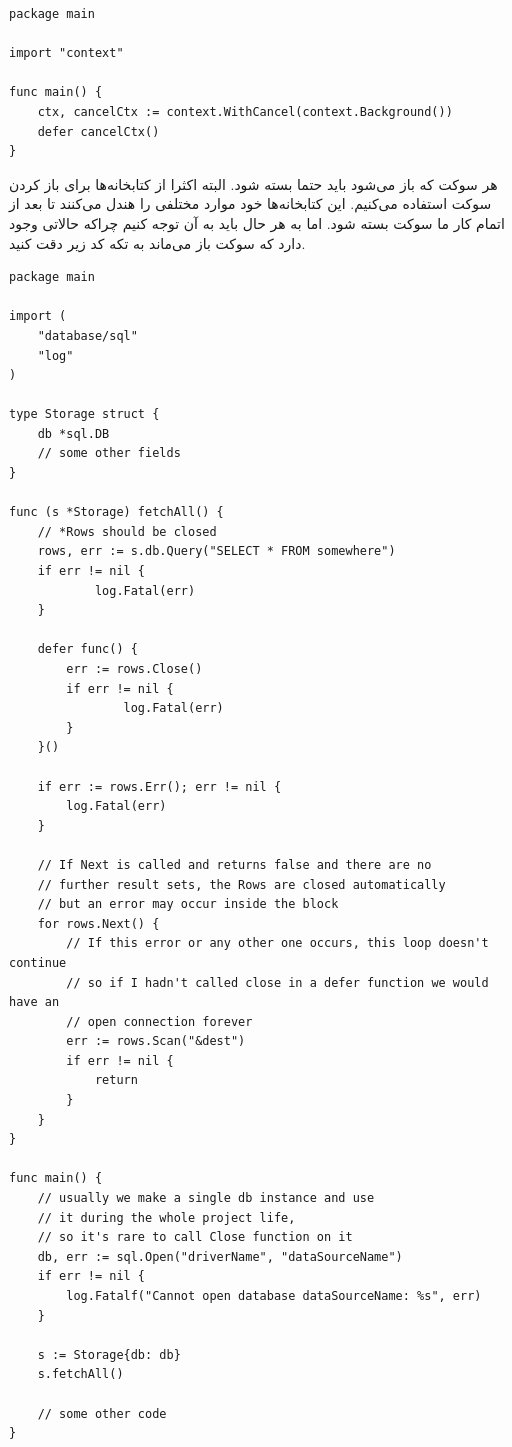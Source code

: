\documentclass[a4]{report}
\begin{document}
\begin{latin}
\begin{verbatim}
package main

import "context"

func main() {
    ctx, cancelCtx := context.WithCancel(context.Background())
    defer cancelCtx()
}
\end{verbatim}
\end{latin}

هر سوکت که باز می‌شود باید حتما بسته شود. البته اکثرا از کتابخانه‌ها برای باز کردن سوکت استفاده می‌کنیم. این کتابخانه‌ها خود موارد مختلفی را هندل می‌کنند تا بعد از اتمام کار ما سوکت بسته شود.
اما به هر حال باید به آن توجه کنیم چراکه حالاتی وجود دارد که سوکت باز می‌ماند به تکه کد زیر دقت کنید.

\begin{latin}
\begin{verbatim}
package main

import (
    "database/sql"
    "log"
)

type Storage struct {
    db *sql.DB
    // some other fields
}

func (s *Storage) fetchAll() {
    // *Rows should be closed
    rows, err := s.db.Query("SELECT * FROM somewhere")
    if err != nil {
            log.Fatal(err)
    }

    defer func() {
        err := rows.Close()
        if err != nil {
                log.Fatal(err)
        }
    }()

    if err := rows.Err(); err != nil {
        log.Fatal(err)
    }

    // If Next is called and returns false and there are no
    // further result sets, the Rows are closed automatically
    // but an error may occur inside the block
    for rows.Next() {
        // If this error or any other one occurs, this loop doesn't continue
        // so if I hadn't called close in a defer function we would have an
        // open connection forever
        err := rows.Scan("&dest")
        if err != nil {
            return
        }
    }
}

func main() {
    // usually we make a single db instance and use
    // it during the whole project life,
    // so it's rare to call Close function on it
    db, err := sql.Open("driverName", "dataSourceName")
    if err != nil {
        log.Fatalf("Cannot open database dataSourceName: %s", err)
    }

    s := Storage{db: db}
    s.fetchAll()

    // some other code
}
\end{verbatim}
\end{latin}
\end{document}
